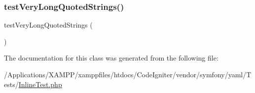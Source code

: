 \subsubsection{\texorpdfstring{test\+Very\+Long\+Quoted\+Strings()}{testVeryLongQuotedStrings()}}
{\footnotesize\ttfamily test\+Very\+Long\+Quoted\+Strings (\begin{DoxyParamCaption}{ }\end{DoxyParamCaption})}



The documentation for this class was generated from the following file\+:\begin{DoxyCompactItemize}
\item 
/\+Applications/\+X\+A\+M\+P\+P/xamppfiles/htdocs/\+Code\+Igniter/vendor/symfony/yaml/\+Tests/\mbox{\hyperlink{_inline_test_8php}{Inline\+Test.\+php}}\end{DoxyCompactItemize}
